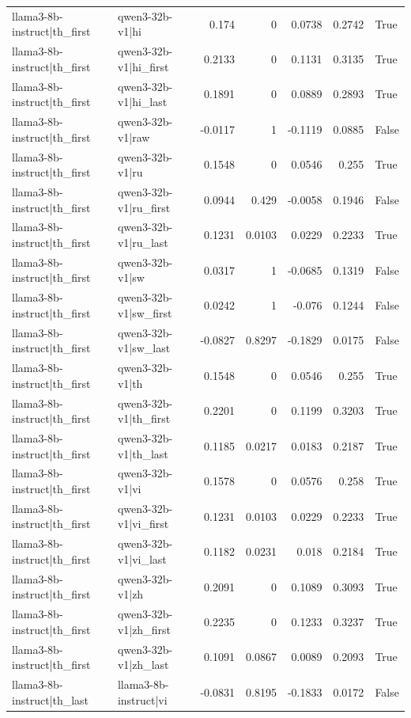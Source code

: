 \begin{table}
\begin{tabular}{l l r r r r l}
llama3-8b-instruct|th_first & qwen3-32b-v1|hi & 0.174 & 0 & 0.0738 & 0.2742 & True \\
llama3-8b-instruct|th_first & qwen3-32b-v1|hi_first & 0.2133 & 0 & 0.1131 & 0.3135 & True \\
llama3-8b-instruct|th_first & qwen3-32b-v1|hi_last & 0.1891 & 0 & 0.0889 & 0.2893 & True \\
llama3-8b-instruct|th_first & qwen3-32b-v1|raw & -0.0117 & 1 & -0.1119 & 0.0885 & False \\
llama3-8b-instruct|th_first & qwen3-32b-v1|ru & 0.1548 & 0 & 0.0546 & 0.255 & True \\
llama3-8b-instruct|th_first & qwen3-32b-v1|ru_first & 0.0944 & 0.429 & -0.0058 & 0.1946 & False \\
llama3-8b-instruct|th_first & qwen3-32b-v1|ru_last & 0.1231 & 0.0103 & 0.0229 & 0.2233 & True \\
llama3-8b-instruct|th_first & qwen3-32b-v1|sw & 0.0317 & 1 & -0.0685 & 0.1319 & False \\
llama3-8b-instruct|th_first & qwen3-32b-v1|sw_first & 0.0242 & 1 & -0.076 & 0.1244 & False \\
llama3-8b-instruct|th_first & qwen3-32b-v1|sw_last & -0.0827 & 0.8297 & -0.1829 & 0.0175 & False \\
llama3-8b-instruct|th_first & qwen3-32b-v1|th & 0.1548 & 0 & 0.0546 & 0.255 & True \\
llama3-8b-instruct|th_first & qwen3-32b-v1|th_first & 0.2201 & 0 & 0.1199 & 0.3203 & True \\
llama3-8b-instruct|th_first & qwen3-32b-v1|th_last & 0.1185 & 0.0217 & 0.0183 & 0.2187 & True \\
llama3-8b-instruct|th_first & qwen3-32b-v1|vi & 0.1578 & 0 & 0.0576 & 0.258 & True \\
llama3-8b-instruct|th_first & qwen3-32b-v1|vi_first & 0.1231 & 0.0103 & 0.0229 & 0.2233 & True \\
llama3-8b-instruct|th_first & qwen3-32b-v1|vi_last & 0.1182 & 0.0231 & 0.018 & 0.2184 & True \\
llama3-8b-instruct|th_first & qwen3-32b-v1|zh & 0.2091 & 0 & 0.1089 & 0.3093 & True \\
llama3-8b-instruct|th_first & qwen3-32b-v1|zh_first & 0.2235 & 0 & 0.1233 & 0.3237 & True \\
llama3-8b-instruct|th_first & qwen3-32b-v1|zh_last & 0.1091 & 0.0867 & 0.0089 & 0.2093 & True \\
llama3-8b-instruct|th_last & llama3-8b-instruct|vi & -0.0831 & 0.8195 & -0.1833 & 0.0172 & False \\

\end{tabular}
\end{table}
